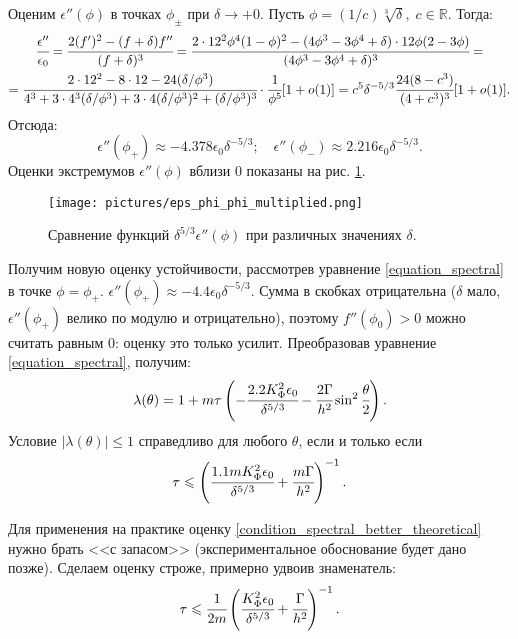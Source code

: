\documentclass[a4paper,12pt]{article}
\theoremstyle{plain}
\theoremstyle{definition}
\begin{document}
Оценим $\epsilon''(\phi)$ в точках $\phi_{\pm}$ при $\delta \to +0$. Пусть $\phi = (1/c) \sqrt[3]{\delta}, \; c \in \mathbb{R}$. Тогда:
\begin{multline*}
    \cfrac{\epsilon''}{\epsilon_0} = \cfrac{2(f')^2 - (f + \delta)f''}{(f + \delta)^3} = \cfrac{2 \cdot 12^2 \phi^4 (1 - \phi)^2 - (4 \phi^3 - 3 \phi^4 + \delta) \cdot 12 \phi (2 - 3 \phi)}{(4 \phi^3 - 3 \phi^4 + \delta)^3} = \\ = \cfrac{2 \cdot 12^2 - 8 \cdot 12 - 24 (\delta/\phi^3)}{4^3 + 3 \cdot 4^3 (\delta/\phi^3) + 3 \cdot 4 (\delta/\phi^3)^2 + (\delta/\phi^3)^3} \cdot \cfrac{1}{\phi^5}[1 + o(1)] = c^5 \delta^{-5/3} \cfrac{24(8 - c^3)}{(4 + c^3)^3}[1 + o(1)] \text{.}
\end{multline*}
Отсюда:
\begin{equation}
    \epsilon''(\phi_+) \approx -4.378 \epsilon_0 \delta^{-5/3}; \quad \epsilon''(\phi_-) \approx 2.216 \epsilon_0 \delta^{-5/3} \text{.}
    \label{value_epsilon_phi_phi_bounds}
\end{equation}
Оценки экстремумов $\epsilon''(\phi)$ вблизи $0$ показаны на рис. \ref{picture_eps_phi_phi_multiplied}.

\begin{figure}[!tp]
    \centering
    \texttt{[image: pictures/eps\_phi\_phi\_multiplied.png]}
    \caption{Сравнение функций $\delta^{5/3} \epsilon''(\phi)$ при различных значениях $\delta$.}
    \label{picture_eps_phi_phi_multiplied}
\end{figure}

Получим новую оценку устойчивости, рассмотрев уравнение \eqref{equation_spectral} в точке $\phi = \phi_+$. $\epsilon''(\phi_+) \approx -4.4 \epsilon_0 \delta^{-5/3}$. Сумма в скобках отрицательна ($\delta$ мало, $\epsilon''(\phi_+)$ велико по модулю и отрицательно), поэтому $f''(\phi_0) > 0$ можно считать равным $0$: оценку это только усилит. Преобразовав уравнение \eqref{equation_spectral}, получим:
$$\lambda(\theta) = 1 + m \tau \left( -\cfrac{2.2 K_\Phi^2 \epsilon_0}{\delta^{5/3}} - \cfrac{2 \Gamma}{h^2} \sin^2 \cfrac{\theta}{2} \right) \text{.}$$
Условие $|\lambda(\theta)| \leqslant 1$ справедливо для любого $\theta$, если и только если
\begin{equation}
    \tau \leqslant \left( \cfrac{1.1 m K_\Phi^2 \epsilon_0}{\delta^{5/3}} + \cfrac{m \Gamma}{h^2} \right)^{-1} \text{.}
    \label{condition_spectral_better_theoretical}
\end{equation}

Для применения на практике оценку \eqref{condition_spectral_better_theoretical} нужно брать <<с запасом>> (экспериментальное обоснование будет дано позже). Сделаем оценку строже, примерно удвоив знаменатель:
\begin{equation}
    \tau \leqslant \cfrac{1}{2m} \left( \cfrac{K_\Phi^2 \epsilon_0}{\delta^{5/3}} + \cfrac{\Gamma}{h^2} \right)^{-1} \text{.}
    \label{condition_spectral_better}
\end{equation}
\end{document}
